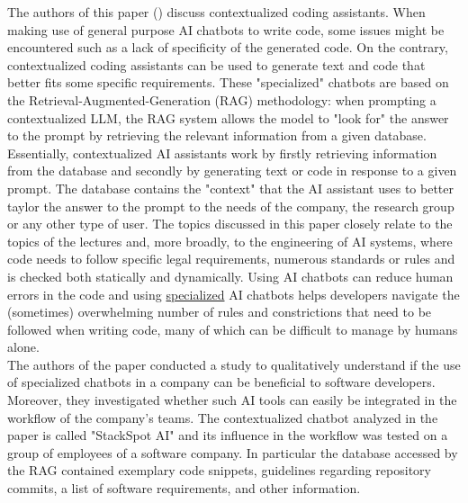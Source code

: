 The authors of this paper (\cite{Pinto}) discuss contextualized coding assistants. When making use of general purpose AI chatbots to write code, some issues might be encountered such as a lack of specificity of the generated code. On the contrary, contextualized coding assistants can be used to generate text and code that better fits some specific requirements. These "specialized" chatbots are based on the Retrieval-Augmented-Generation (RAG) methodology: when prompting a contextualized LLM, the RAG system allows the model to "look for" the answer to the prompt by retrieving the relevant information from a given database. Essentially, contextualized AI assistants work by firstly retrieving information from the database and secondly by generating text or code in response to a given prompt. The database contains the "context" that the AI assistant uses to better taylor the answer to the prompt to the needs of the company, the research group or any other type of user. The topics discussed in this paper closely relate to the topics of the lectures and, more broadly, to the engineering of AI systems, where code needs to follow specific legal requirements, numerous standards or rules and is checked both statically and dynamically. Using AI chatbots can reduce human errors in the code and using \underline{specialized} AI chatbots helps developers navigate the (sometimes) overwhelming number of rules and constrictions that need to be followed when writing code, many of which can be difficult to manage by humans alone.\\
The authors of the paper conducted a study to qualitatively understand if the use of specialized chatbots in a company can be beneficial to software developers. Moreover, they investigated whether such AI tools can easily be integrated in the workflow of the company's teams. The contextualized chatbot analyzed in the paper is called "StackSpot AI" and its influence in the workflow was tested on a group of employees of a software company. In particular the database accessed by the RAG contained exemplary code snippets, guidelines regarding repository commits, a list of software requirements, and other information.%

